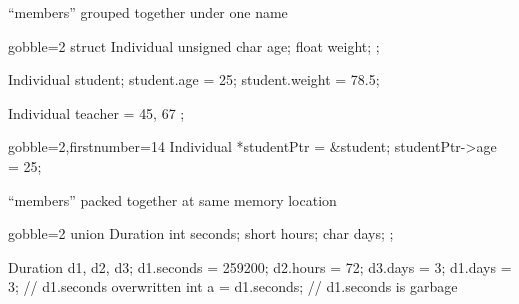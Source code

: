 \begin{frame}[fragile]
  \begin{mdframed}[style=simplebox]
    \center ``members'' grouped together under one name
  \end{mdframed}
  \begin{multicols}{2}
    \begin{cppcode*}{gobble=2}
      struct Individual {
        unsigned char age;
        float weight;
      };

      Individual student;
      student.age = 25;
      student.weight = 78.5;

      Individual teacher = {
        45, 67
      };
    \end{cppcode*}
    \columnbreak
    \begin{cppcode*}{gobble=2,firstnumber=14}
      Individual *studentPtr =
        &student;
      studentPtr->age = 25;
    \end{cppcode*}
    \pause
    \vfill
    \hspace{-1.5cm}
    \vfill \null
  \end{multicols}
\end{frame}

\begin{frame}[fragile]
  \begin{mdframed}[style=simplebox]
    \center ``members'' packed together at same memory location
  \end{mdframed}
  \begin{multicols}{2}
    \begin{cppcode*}{gobble=2}
      union Duration {
        int seconds;
        short hours;
        char days;
      };

      Duration d1, d2, d3;
      d1.seconds = 259200;
      d2.hours = 72;
      d3.days = 3;
      d1.days = 3; // d1.seconds overwritten
      int a = d1.seconds; // d1.seconds is garbage
    \end{cppcode*}
    \pause
    \columnbreak
    \null \vfill
    \vfill \null
  \end{multicols}
\end{frame}

